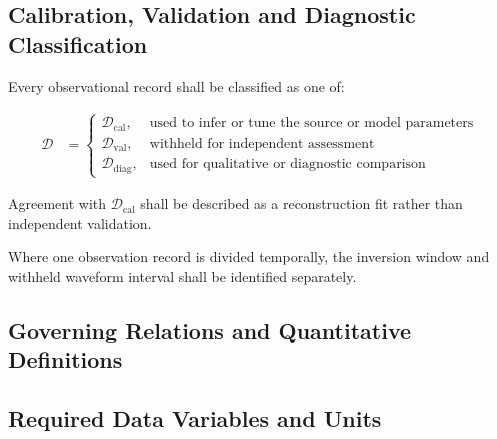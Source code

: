 \subsection{Calibration, Validation and Diagnostic Classification}
\label{sec:res-dat-obs-data-classification}

Every observational record shall be classified as one of:

\begin{align}
  \mathcal{D}
  &=
  \begin{cases}
    \mathcal{D}_{\mathrm{cal}},
    &
    \text{used to infer or tune the source or model parameters}
    \\
    \mathcal{D}_{\mathrm{val}},
    &
    \text{withheld for independent assessment}
    \\
    \mathcal{D}_{\mathrm{diag}},
    &
    \text{used for qualitative or diagnostic comparison}
  \end{cases}
  \label{eq:res-dat-obs-data-classification}
\end{align}

Agreement with $\mathcal{D}_{\mathrm{cal}}$ shall be described as a
reconstruction fit rather than independent validation.

Where one observation record is divided temporally, the inversion
window and withheld waveform interval shall be identified separately.

\subsection{Governing Relations and Quantitative Definitions}
\label{sec:res-dat-obs-governing-relations}

%

\subsection{Required Data Variables and Units}
\label{sec:res-dat-obs-required-data-variables-units}


